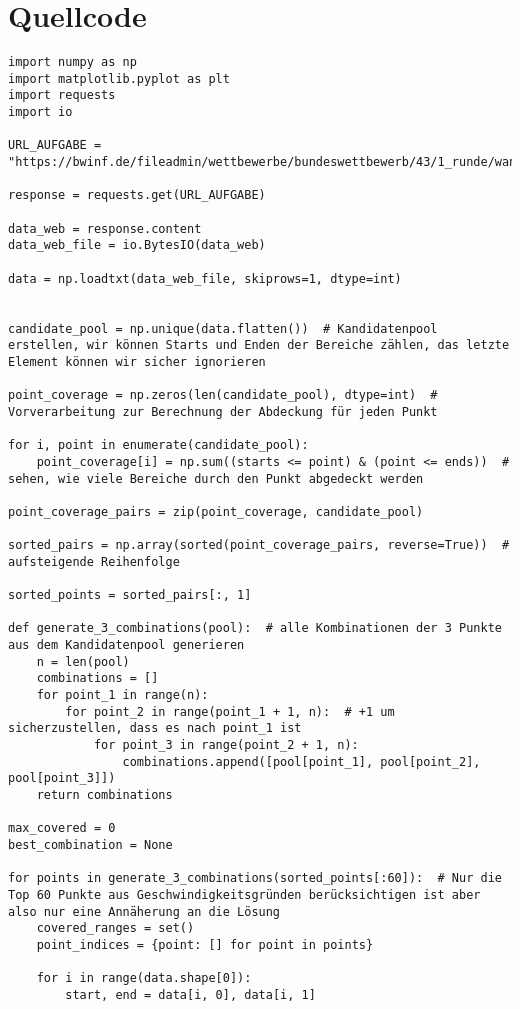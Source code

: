 \section{Quellcode}
\begin{lstlisting}
import numpy as np
import matplotlib.pyplot as plt
import requests
import io

URL_AUFGABE = "https://bwinf.de/fileadmin/wettbewerbe/bundeswettbewerb/43/1_runde/wandern2.txt"

response = requests.get(URL_AUFGABE)

data_web = response.content
data_web_file = io.BytesIO(data_web)

data = np.loadtxt(data_web_file, skiprows=1, dtype=int)


candidate_pool = np.unique(data.flatten())  # Kandidatenpool erstellen, wir können Starts und Enden der Bereiche zählen, das letzte Element können wir sicher ignorieren

point_coverage = np.zeros(len(candidate_pool), dtype=int)  # Vorverarbeitung zur Berechnung der Abdeckung für jeden Punkt

for i, point in enumerate(candidate_pool):
    point_coverage[i] = np.sum((starts <= point) & (point <= ends))  # sehen, wie viele Bereiche durch den Punkt abgedeckt werden

point_coverage_pairs = zip(point_coverage, candidate_pool)

sorted_pairs = np.array(sorted(point_coverage_pairs, reverse=True))  # aufsteigende Reihenfolge

sorted_points = sorted_pairs[:, 1]

def generate_3_combinations(pool):  # alle Kombinationen der 3 Punkte aus dem Kandidatenpool generieren
    n = len(pool)
    combinations = []
    for point_1 in range(n):
        for point_2 in range(point_1 + 1, n):  # +1 um sicherzustellen, dass es nach point_1 ist
            for point_3 in range(point_2 + 1, n):
                combinations.append([pool[point_1], pool[point_2], pool[point_3]])
    return combinations

max_covered = 0
best_combination = None

for points in generate_3_combinations(sorted_points[:60]):  # Nur die Top 60 Punkte aus Geschwindigkeitsgründen berücksichtigen ist aber also nur eine Annäherung an die Lösung
    covered_ranges = set()
    point_indices = {point: [] for point in points}

    for i in range(data.shape[0]):
        start, end = data[i, 0], data[i, 1]


\end{lstlisting}
